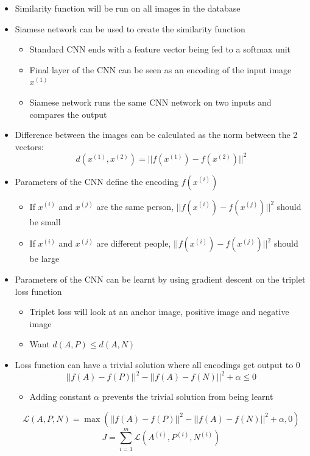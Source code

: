 \documentclass[12pt, letterpaper]{article}
\begin{document}
\begin{itemize}
\begin{itemize}
        \end{itemize}
        \item Similarity function will be run on all images in the database
        \item Siamese network can be used to create the similarity function
        \begin{itemize}
            \item Standard CNN ends with a feature vector being fed to a softmax unit
            \item Final layer of the CNN can be seen as an encoding of the input image $x^{(1)}$
            \item Siamese network runs the same CNN network on two inputs and compares the output
        \end{itemize}
        \item Difference between the images can be calculated as the norm between the 2 vectors: 
        $$d(x^{(1)}, x^{(2)})=||f(x^{(1)})-f(x^{(2)})||^2$$
        \item Parameters of the CNN define the encoding $f(x^{(i)})$
        \begin{itemize}
            \item If $x^{(i)}$ and $x^{(j)}$ are the same person, $||f(x^{(i)})-f(x^{(j)})||^2$ should be small
            \item If $x^{(i)}$ and $x^{(j)}$ are different people, $||f(x^{(i)})-f(x^{(j)})||^2$ should be large
        \end{itemize}
        \item Parameters of the CNN can be learnt by using gradient descent on the triplet loss function
        \begin{itemize}
            \item Triplet loss will look at an anchor image, positive image and negative image
            \item Want $d(A,P)\leq d(A,N)$
        \end{itemize}
        \item Loss function can have a trivial solution where all encodings get output to 0
        $$||f(A)-f(P)||^2-||f(A)-f(N)||^2+\alpha\leq 0$$
        \begin{itemize}
            \item Adding constant $\alpha$ prevents the trivial solution from being learnt
        \end{itemize}
        $$\mathcal{L}(A,P,N)=\max(||f(A)-f(P)||^2-||f(A)-f(N)||^2+\alpha, 0)$$
        $$J=\sum_{i=1}^m\mathcal{L}(A^{(i)}, P^{(i)}, N^{(i)})$$ 

\end{itemize}
\end{document}

